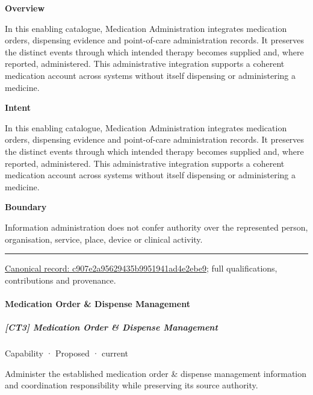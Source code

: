 \textbf{Overview}



In this enabling catalogue, Medication Administration integrates medication orders, dispensing evidence and point-of-care administration records. It preserves the distinct events through which intended therapy becomes supplied and, where reported, administered. This administrative integration supports a coherent medication account across systems without itself dispensing or administering a medicine.



\textbf{Intent}



In this enabling catalogue, Medication Administration integrates medication orders, dispensing evidence and point-of-care administration records. It preserves the distinct events through which intended therapy becomes supplied and, where reported, administered. This administrative integration supports a coherent medication account across systems without itself dispensing or administering a medicine.



\textbf{Boundary}



Information administration does not confer authority over the represented person, organisation, service, place, device or clinical activity.



\medskip\hrule\medskip

{\footnotesize \href{../../../../continuum/strategy/capability/c907e2a95629435b9951941ad4e2ebe9.md}{Canonical record: c907e2a95629435b9951941ad4e2ebe9}; full qualifications, contributions and provenance.}\par
\paragraph{Medication Order \& Dispense Management}

\subparagraph{[CT3] Medication Order \& Dispense Management}

\label{element:9874098228764b62b1f640ea749b742d}
{\small Capability · Proposed · current}\par

Administer the established medication order \& dispense management information and coordination responsibility while preserving its source authority.



